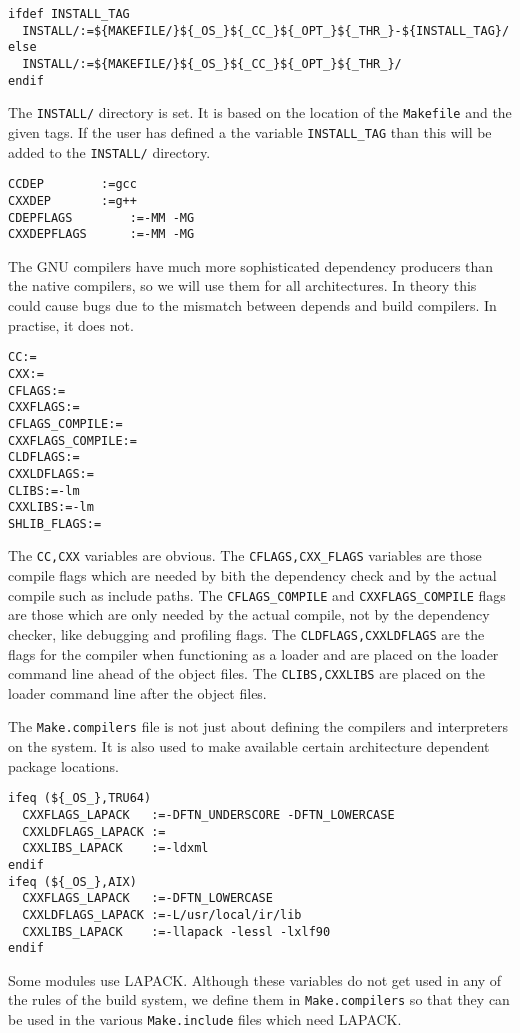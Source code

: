\documentclass[letterpaper]{article}
\begin{document}
\begin{verbatim}
ifdef INSTALL_TAG
  INSTALL/:=${MAKEFILE/}${_OS_}${_CC_}${_OPT_}${_THR_}-${INSTALL_TAG}/
else
  INSTALL/:=${MAKEFILE/}${_OS_}${_CC_}${_OPT_}${_THR_}/
endif
\end{verbatim}
The \verb+INSTALL/+ directory is set.  It is based on the location
of the \verb+Makefile+ and the given tags.
If the user has defined a the variable \verb+INSTALL_TAG+ than this
will be added to the \verb+INSTALL/+ directory.

\begin{verbatim}
CCDEP		 :=gcc
CXXDEP		 :=g++
CDEPFLAGS        :=-MM -MG
CXXDEPFLAGS      :=-MM -MG
\end{verbatim}
The GNU compilers have much more sophisticated dependency producers than
the native compilers, so we will use them for all architectures.  In
theory this could cause bugs due to the mismatch between depends and
build compilers.  In practise, it does not.

\begin{verbatim}
CC:=
CXX:=
CFLAGS:=
CXXFLAGS:=
CFLAGS_COMPILE:=
CXXFLAGS_COMPILE:=
CLDFLAGS:=
CXXLDFLAGS:=
CLIBS:=-lm
CXXLIBS:=-lm
SHLIB_FLAGS:=
\end{verbatim}
The \verb+CC,CXX+ variables are obvious.  The \verb+CFLAGS,CXX_FLAGS+
variables are those compile flags which are needed by bith the
dependency check and by the actual compile such as
include paths.  The \verb+CFLAGS_COMPILE+
and \verb+CXXFLAGS_COMPILE+ flags are those which are only needed by
the actual compile, not by the dependency checker, like debugging
and profiling flags.  The \verb+CLDFLAGS,CXXLDFLAGS+ are the flags
for the compiler when functioning as a loader and are placed on
the loader command line ahead of the object files.  The
\verb+CLIBS,CXXLIBS+ are placed on the loader command line after the
object files.

The \verb+Make.compilers+ file is not just about defining the compilers
and interpreters on the system.  It is also used to make available certain
architecture dependent package locations.
\begin{verbatim}
ifeq (${_OS_},TRU64)
  CXXFLAGS_LAPACK   :=-DFTN_UNDERSCORE -DFTN_LOWERCASE
  CXXLDFLAGS_LAPACK :=
  CXXLIBS_LAPACK    :=-ldxml
endif
ifeq (${_OS_},AIX)
  CXXFLAGS_LAPACK   :=-DFTN_LOWERCASE
  CXXLDFLAGS_LAPACK :=-L/usr/local/ir/lib
  CXXLIBS_LAPACK    :=-llapack -lessl -lxlf90
endif
\end{verbatim}
Some modules use LAPACK.  Although these variables do not get used
in any of the rules of the build system, we define them in 
\verb+Make.compilers+ so that they can be used in the various
\verb+Make.include+ files which need LAPACK.
\end{document}
